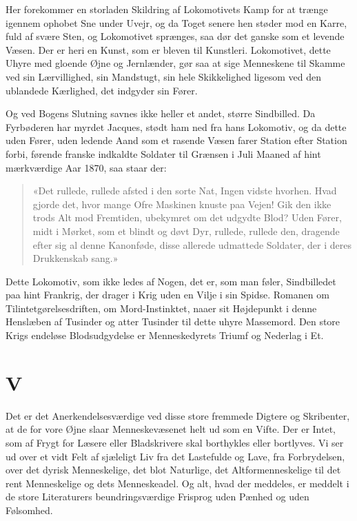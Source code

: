 \documentclass[12pt,a4paper]{article}
\begin{document}
Her forekommer en storladen Skildring af Lokomotivets Kamp for at trænge
igennem ophobet Sne under Uvejr, og da Toget senere hen støder mod en
Karre, fuld af svære Sten, og Lokomotivet sprænges, saa dør det ganske
som et levende Væsen. Der er heri en Kunst, som er bleven til Kunstleri.
Lokomotivet, dette Uhyre med gloende Øjne og Jernlænder, gør saa at sige
Menneskene til Skamme ved sin Lærvillighed, sin Mandstugt, sin hele
Skikkelighed ligesom ved den ublandede Kærlighed, det indgyder sin Fører.

Og ved Bogens Slutning savnes ikke heller et andet, større Sindbilled. Da
Fyrbøderen har myrdet Jacques, stødt ham ned fra hans Lokomotiv, og da
dette uden Fører, uden ledende Aand som et rasende Væsen farer Station
efter Station forbi, førende franske indkaldte Soldater til Grænsen i
Juli Maaned af hint mærkværdige Aar 1870, saa staar der:

\begin{quote}
«Det rullede, rullede afsted i den sorte Nat, Ingen vidste hvorhen.
Hvad gjorde det, hvor mange Ofre Maskinen knuste paa Vejen! Gik den ikke
trods Alt mod Fremtiden, ubekymret om det udgydte Blod? Uden Fører, midt
i Mørket, som et blindt og døvt Dyr, rullede, rullede den, dragende efter
sig al denne Kanonføde, disse allerede udmattede Soldater, der i deres
Drukkenskab sang.»
\end{quote}

Dette Lokomotiv, som ikke ledes af Nogen, det er, som man føler,
Sindbilledet paa hint Frankrig, der drager i Krig uden en Vilje i sin
Spidse. Romanen om Tilintetgørelsesdriften, om Mord-Instinktet, naaer sit
Højdepunkt i denne Henslæben af Tusinder og atter Tusinder til dette
uhyre Massemord. Den store Krigs endeløse Blodsudgydelse er
Menneskedyrets Triumf og Nederlag i Et.

\section*{V}

Det er det Anerkendelsesværdige ved disse store fremmede Digtere og
Skribenter, at de for vore Øjne slaar Menneskevæsenet helt ud som en
Vifte. Der er Intet, som af Frygt for Læsere eller Bladskrivere skal
borthykles eller bortlyves. Vi ser ud over et vidt Felt af sjæleligt Liv
fra det Lastefulde og Lave, fra Forbrydelsen, over det dyrisk
Menneskelige, det blot Naturlige, det Altformenneskelige til det rent
Menneskelige og dets Menneskeadel. Og alt, hvad der meddeles, er meddelt
i de store Literaturers beundringsværdige Frisprog uden Pænhed og uden
Følsomhed.
\end{document}
